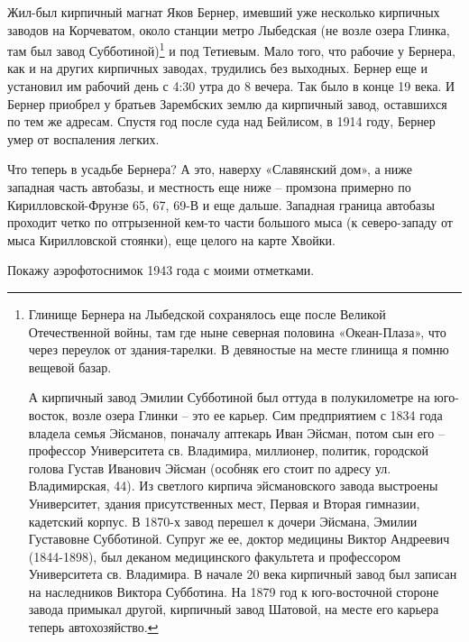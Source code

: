 Жил-был кирпичный магнат Яков Бернер, имевший уже несколько кирпичных заводов на Корчеватом, около станции метро Лыбедская (не возле озера Глинка, там был завод Субботиной)\footnote{Глинище Бернера на Лыбедской сохранялось еще после Великой Отечественной войны, там где ныне северная половина «Океан-Плаза», что через переулок от здания-тарелки. В девяностые на месте глинища я помню вещевой базар. 

А кирпичный завод Эмилии Субботиной был оттуда в полукилометре на юго-восток, возле озера Глинки – это ее карьер. Сим предприятием с 1834 года владела семья Эйсманов, поначалу аптекарь Иван Эйсман, потом сын его – профессор Университета св. Владимира, миллионер, политик, городской голова Густав Иванович Эйсман (особняк его стоит по адресу ул. Владимирская, 44). Из светлого кирпича эйсмановского завода выстроены Университет, здания присутственных мест, Первая и Вторая гимназии, кадетский корпус. В 1870-х завод перешел к дочери Эйсмана, Эмилии Густавовне Субботиной. Супруг же ее, доктор медицины Виктор Андреевич (1844-1898), был деканом медицинского факультета и профессором Университета св. Владимира. В начале 20 века кирпичный завод был записан на наследников Виктора Субботина. На 1879 год к юго-восточной стороне завода примыкал другой, кирпичный завод Шатовой, на месте его карьера теперь автохозяйство.} и под Тетиевым. Мало того, что рабочие у Бернера, как и на других кирпичных заводах, трудились без выходных. Бернер еще и установил им рабочий день с 4:30 утра до 8 вечера. Так было в конце 19 века. И Бернер приобрел у братьев Зарембских землю да кирпичный завод, оставшихся по тем же адресам. Спустя год после суда над Бейлисом, в 1914 году, Бернер умер от воспаления легких.


Что теперь в усадьбе Бернера? А это, наверху «Славянский дом», а ниже западная часть автобазы, и местность еще ниже – промзона примерно по Кирилловской-Фрунзе 65, 67, 69-В и еще дальше. Западная граница автобазы проходит четко по отгрызенной кем-то части большого мыса (к северо-западу от мыса Кирилловской стоянки), еще целого на карте Хвойки.

Покажу аэрофотоснимок 1943 года с моими отметками.

